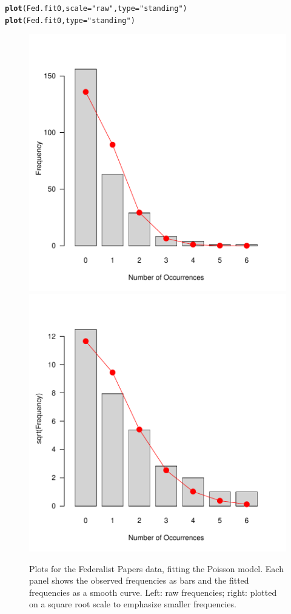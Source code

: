 \documentclass[11pt]{book}\usepackage[]{graphicx}\usepackage[]{color}
\makeatletter
\newcommand{\hlstr}[1]{\textcolor[rgb]{0.192,0.494,0.8}{#1}}%
\newcommand{\hlstd}[1]{\textcolor[rgb]{0.345,0.345,0.345}{#1}}%
\newcommand{\hlkwc}[1]{\textcolor[rgb]{0.333,0.667,0.333}{#1}}%
\newcommand{\hlkwd}[1]{\textcolor[rgb]{0.737,0.353,0.396}{\textbf{#1}}}%
\newenvironment{kframe}{%
 \def\at@end@of@kframe{}%
 \ifinner\ifhmode%
  \def\at@end@of@kframe{\end{minipage}}%
  \begin{minipage}{\columnwidth}%
 \fi\fi%
 \def\FrameCommand##1{\hskip\@totalleftmargin \hskip-\fboxsep
 \colorbox{shadecolor}{##1}\hskip-\fboxsep
     \hskip-\linewidth \hskip-\@totalleftmargin \hskip\columnwidth}%
 \MakeFramed {\advance\hsize-\width
   \@totalleftmargin\z@ \linewidth\hsize
   \@setminipage}}%
 {\par\unskip\endMakeFramed%
 \at@end@of@kframe}
\newenvironment{knitrout}{}{} %
\renewenvironment{knitrout}{\small\renewcommand{\baselinestretch}{.85}}{} %
\makeatother
\begin{document}
\begin{knitrout}
\color{fgcolor}\begin{kframe}
\begin{alltt}
\hlkwd{plot}\hlstd{(Fed.fit0,} \hlkwc{scale}\hlstd{=}\hlstr{"raw"}\hlstd{,} \hlkwc{type}\hlstd{=}\hlstr{"standing"}\hlstd{)}
\hlkwd{plot}\hlstd{(Fed.fit0,} \hlkwc{type}\hlstd{=}\hlstr{"standing"}\hlstd{)}
\end{alltt}
\end{kframe}\begin{figure}[htbp]


\centerline{\includegraphics[width=.48\textwidth]{ch03/fig/Fed0-plots11} 
\includegraphics[width=.48\textwidth]{ch03/fig/Fed0-plots12} }

\caption[Plots for the Federalist Papers data, fitting the Poisson model]{Plots for the Federalist Papers data, fitting the Poisson model. Each panel shows the observed frequencies as bars and the fitted frequencies as a smooth curve. Left: raw frequencies; right: plotted on a square root scale to emphasize smaller frequencies.\label{fig:Fed0-plots1}}
\end{figure}


\end{knitrout}
\end{document}
